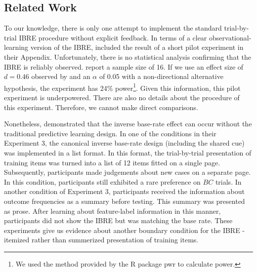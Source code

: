 \documentclass[10pt,letterpaper]{article}
\begin{document}
\subsection{Related Work}

To our knowledge, there is only one attempt to implement the standard trial-by-trial IBRE procedure without explicit feedback.
In terms of a clear observational-learning version of the IBRE,  included the result of a short pilot experiment in their Appendix.
Unfortunately, there is no statistical analysis confirming that the IBRE is reliably observed.
 report a sample size of 16.
If we use an effect size of $d = 0.46$ observed by  and an $\alpha$ of 0.05 with a non-directional alternative hypothesis, the experiment has 24\% power\footnote{We used the method provided by the R package pwr \cite{champely2020pwr} to calculate power.}.
Given this information, this pilot experiment is underpowered.
There are also no details about the procedure of this experiment.
Therefore, we cannot make direct comparisons.

Nonetheless,  demonstrated that the inverse base-rate effect can occur without the traditional predictive learning design.
In one of the conditions in their Experiment 3, the canonical inverse base-rate design (including the shared cue) was implemented in a list format.
In this format, the trial-by-trial presentation of training items was turned into a list of 12 items fitted on a single page.
Subsequently, participants made judgements about new cases on a separate page.
In this condition, participants still exhibited a rare preference on $BC$ trials.
In another condition of Experiment 3, participants received the information about outcome frequencies as a summary before testing.
This summary was presented as prose.
After learning about feature-label information in this manner, participants did not show the IBRE but was matching the base rate.
These experiments give us evidence about another boundary condition for the IBRE - itemized rather than summerized presentation of training items.
\end{document}
